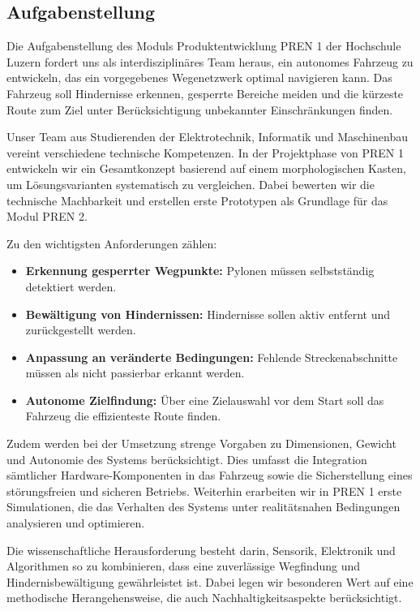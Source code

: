 \documentclass[main.tex]{subfiles} %
\begin{document}

\subsection{Aufgabenstellung}

Die Aufgabenstellung des Moduls Produktentwicklung PREN 1 der
Hochschule Luzern fordert uns als interdisziplinäres Team heraus, ein autonomes 
Fahrzeug zu entwickeln, das ein vorgegebenes Wegenetzwerk optimal navigieren kann. 
Das Fahrzeug soll Hindernisse erkennen, gesperrte Bereiche meiden und die kürzeste 
Route zum Ziel unter Berücksichtigung unbekannter Einschränkungen finden.

Unser Team aus Studierenden der Elektrotechnik, Informatik und Maschinenbau 
vereint verschiedene technische Kompetenzen. In der Projektphase von PREN 1 
entwickeln wir ein Gesamtkonzept basierend auf einem morphologischen Kasten, 
um Lösungsvarianten systematisch zu vergleichen. Dabei bewerten wir die technische 
Machbarkeit und erstellen erste Prototypen als Grundlage für das Modul PREN 2.

Zu den wichtigsten Anforderungen zählen:
\begin{itemize}
    \item \textbf{Erkennung gesperrter Wegpunkte:} Pylonen müssen selbstständig detektiert werden.
    \item \textbf{Bewältigung von Hindernissen:} Hindernisse sollen aktiv entfernt und zurückgestellt werden.
    \item \textbf{Anpassung an veränderte Bedingungen:} Fehlende Streckenabschnitte müssen als nicht passierbar erkannt werden.
    \item \textbf{Autonome Zielfindung:} Über eine Zielauswahl vor dem Start soll das Fahrzeug die effizienteste Route finden.
\end{itemize}

Zudem werden bei der Umsetzung strenge Vorgaben zu Dimensionen, Gewicht und
Autonomie des Systems berücksichtigt. Dies umfasst die Integration sämtlicher
Hardware-Komponenten in das Fahrzeug sowie die Sicherstellung eines
störungsfreien und sicheren Betriebs. Weiterhin erarbeiten wir in PREN 1 erste
Simulationen, die das Verhalten des Systems unter realitätsnahen Bedingungen
analysieren und optimieren.

Die wissenschaftliche Herausforderung besteht darin, Sensorik, Elektronik 
und Algorithmen so zu kombinieren, dass eine zuverlässige Wegfindung und 
Hindernisbewältigung gewährleistet ist. Dabei legen wir besonderen Wert auf 
eine methodische Herangehensweise, die auch Nachhaltigkeitsaspekte berücksichtigt.
\end{document}
